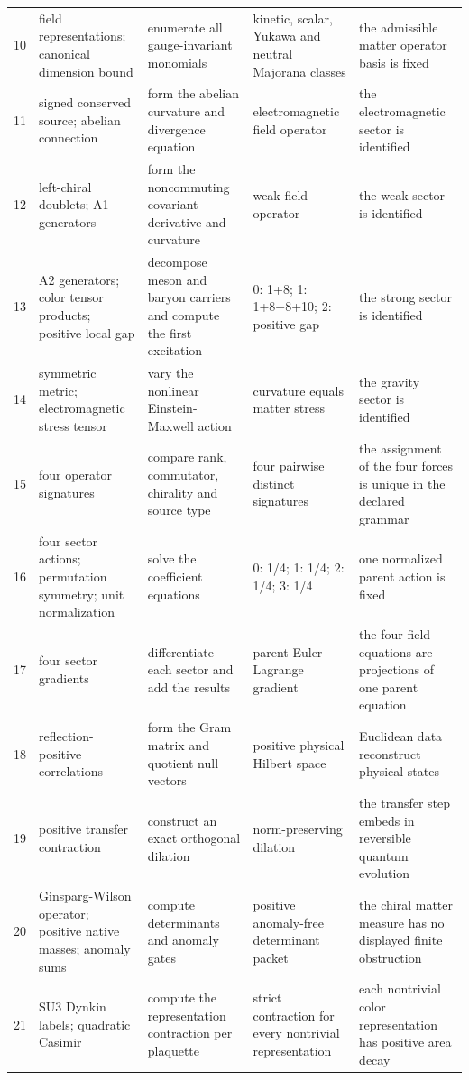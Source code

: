 \documentclass[11pt]{article}
\numberwithin{equation}{section}
\theoremstyle{remark}
\begin{document}
\begin{landscape}
\begin{longtable}{p{0.65cm}p{3.5cm}p{4.0cm}p{4.0cm}p{4.6cm}}
10&field representations; canonical dimension bound&enumerate all gauge-invariant monomials&kinetic, scalar, Yukawa and neutral Majorana classes&the admissible matter operator basis is fixed\\
11&signed conserved source; abelian connection&form the abelian curvature and divergence equation&electromagnetic field operator&the electromagnetic sector is identified\\
12&left-chiral doublets; A1 generators&form the noncommuting covariant derivative and curvature&weak field operator&the weak sector is identified\\
13&A2 generators; color tensor products; positive local gap&decompose meson and baryon carriers and compute the first excitation&0: 1+8; 1: 1+8+8+10; 2: positive gap&the strong sector is identified\\
14&symmetric metric; electromagnetic stress tensor&vary the nonlinear Einstein-Maxwell action&curvature equals matter stress&the gravity sector is identified\\
15&four operator signatures&compare rank, commutator, chirality and source type&four pairwise distinct signatures&the assignment of the four forces is unique in the declared grammar\\
16&four sector actions; permutation symmetry; unit normalization&solve the coefficient equations&0: 1/4; 1: 1/4; 2: 1/4; 3: 1/4&one normalized parent action is fixed\\
17&four sector gradients&differentiate each sector and add the results&parent Euler-Lagrange gradient&the four field equations are projections of one parent equation\\
18&reflection-positive correlations&form the Gram matrix and quotient null vectors&positive physical Hilbert space&Euclidean data reconstruct physical states\\
19&positive transfer contraction&construct an exact orthogonal dilation&norm-preserving dilation&the transfer step embeds in reversible quantum evolution\\
20&Ginsparg-Wilson operator; positive native masses; anomaly sums&compute determinants and anomaly gates&positive anomaly-free determinant packet&the chiral matter measure has no displayed finite obstruction\\
21&SU3 Dynkin labels; quadratic Casimir&compute the representation contraction per plaquette&strict contraction for every nontrivial representation&each nontrivial color representation has positive area decay\\

\end{longtable}
\end{landscape}
\end{document}

